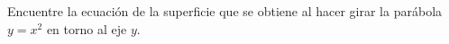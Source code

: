 \item Encuentre la ecuación de la superficie que se obtiene al hacer girar la parábola $y = x^2$ en torno al eje $y$.
